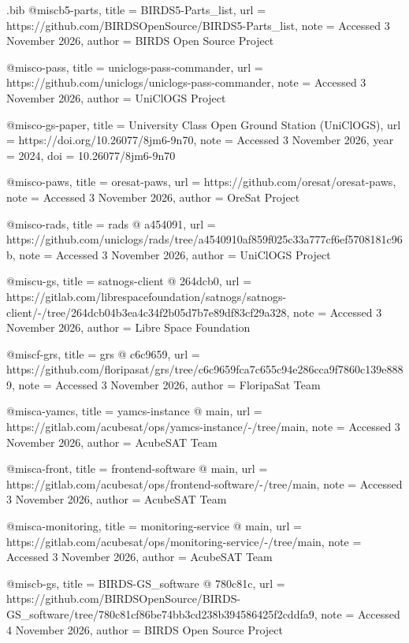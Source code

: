 \begin{filecontents*}[overwrite]{\jobname.bib}
@misc{b5-parts,
  title = {{BIRDS5-\allowbreak{}Parts\_\allowbreak{}list}},
  url = {https://github.com/BIRDSOpenSource/BIRDS5-Parts_list},
  note = {Accessed 3 November 2026},
  author = {{BIRDS Open Source Project}}
}

@misc{o-pass,
  title = {{uniclogs-\allowbreak{}pass-\allowbreak{}commander}},
  url = {https://github.com/uniclogs/uniclogs-pass-commander},
  note = {Accessed 3 November 2026},
  author = {{UniClOGS Project}}
}

@misc{o-gs-paper,
  title = {{University Class Open Ground Station (UniClOGS)}},
  url = {https://doi.org/10.26077/8jm6-9n70},
  note = {Accessed 3 November 2026},
  year = {2024},
  doi = {10.26077/8jm6-9n70}
}

@misc{o-paws,
  title = {{oresat-\allowbreak{}paws}},
  url = {https://github.com/oresat/oresat-paws},
  note = {Accessed 3 November 2026},
  author = {{OreSat Project}}
}

@misc{o-rads,
  title = {{rads @ a454091}},
  url = {https://github.com/uniclogs/rads/tree/a4540910af859f025c33a777cf6ef5708181c96b},
  note = {Accessed 3 November 2026},
  author = {{UniClOGS Project}}
}

@misc{u-gs,
  title = {{satnogs-\allowbreak{}client @ 264dcb0}},
  url = {https://gitlab.com/librespacefoundation/satnogs/satnogs-client/-/tree/264dcb04b3ea4c34f2b05d7b7e89df83cf29a328},
  note = {Accessed 3 November 2026},
  author = {{Libre Space Foundation}}
}

@misc{f-grs,
  title = {{grs @ c6c9659}},
  url = {https://github.com/floripasat/grs/tree/c6c9659fca7c655c94e286cca9f7860c139e8889},
  note = {Accessed 3 November 2026},
  author = {{FloripaSat Team}}
}

@misc{a-yamcs,
  title = {{yamcs-\allowbreak{}instance @ main}},
  url = {https://gitlab.com/acubesat/ops/yamcs-instance/-/tree/main},
  note = {Accessed 3 November 2026},
  author = {{AcubeSAT Team}}
}

@misc{a-front,
  title = {{frontend-\allowbreak{}software @ main}},
  url = {https://gitlab.com/acubesat/ops/frontend-software/-/tree/main},
  note = {Accessed 3 November 2026},
  author = {{AcubeSAT Team}}
}

@misc{a-monitoring,
  title = {{monitoring-\allowbreak{}service @ main}},
  url = {https://gitlab.com/acubesat/ops/monitoring-service/-/tree/main},
  note = {Accessed 3 November 2026},
  author = {{AcubeSAT Team}}
}

@misc{b-gs,
  title = {{BIRDS-\allowbreak{}GS\_\allowbreak{}software @ 780c81c}},
  url = {https://github.com/BIRDSOpenSource/BIRDS-GS_software/tree/780c81cf86be74bb3cd238b394586425f2cddfa9},
  note = {Accessed 4 November 2026},
  author = {{BIRDS Open Source Project}}
}


\end{filecontents*}
